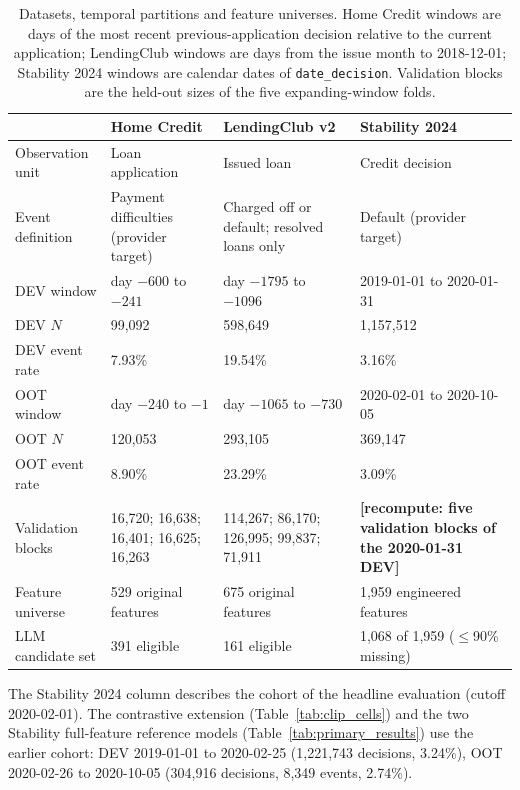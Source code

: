 \documentclass[final,5p,twocolumn]{elsarticle}
\begin{document}
\begin{table}[htbp]
\centering
\footnotesize
\begin{threeparttable}
\caption{Datasets, temporal partitions and feature universes. Home Credit windows are days of the most recent previous-application decision relative to the current application; LendingClub windows are days from the issue month to 2018-12-01; Stability 2024 windows are calendar dates of \texttt{date\_decision}. Validation blocks are the held-out sizes of the five expanding-window folds.}
\label{tab:datasets}
\begin{tabular}{@{}lL{29mm}L{31mm}L{31mm}@{}}
\toprule
 & Home Credit & LendingClub v2 & Stability 2024 \\
\midrule
Observation unit & Loan application & Issued loan & Credit decision \\
Event definition & Payment difficulties (provider target) & Charged off or default; resolved loans only & Default (provider target) \\
DEV window & day $-600$ to $-241$ & day $-1795$ to $-1096$ & 2019-01-01 to 2020-01-31 \\
DEV $N$ & 99,092 & 598,649 & 1,157,512 \\
DEV event rate & 7.93\% & 19.54\% & 3.16\% \\
OOT window & day $-240$ to $-1$ & day $-1065$ to $-730$ & 2020-02-01 to 2020-10-05 \\
OOT $N$ & 120,053 & 293,105 & 369,147 \\
OOT event rate & 8.90\% & 23.29\% & 3.09\% \\
Validation blocks & 16,720; 16,638; 16,401; 16,625; 16,263 & 114,267; 86,170; 126,995; 99,837; 71,911 & \textbf{[recompute: five validation blocks of the 2020-01-31 DEV]} \\ %
Feature universe & 529 original features & 675 original features & 1,959 engineered features \\
LLM candidate set & 391 eligible & 161 eligible & 1,068 of 1,959 ($\le$90\% missing) \\
\bottomrule
\end{tabular}
\begin{tablenotes}\footnotesize
\item The Stability 2024 column describes the cohort of the headline evaluation (cutoff 2020-02-01). The contrastive extension (Table~\ref{tab:clip_cells}) and the two Stability full-feature reference models (Table~\ref{tab:primary_results}) use the earlier cohort: DEV 2019-01-01 to 2020-02-25 (1,221,743 decisions, 3.24\%), OOT 2020-02-26 to 2020-10-05 (304,916 decisions, 8,349 events, 2.74\%).
\end{tablenotes}
\end{threeparttable}
\end{table}
\end{document}
